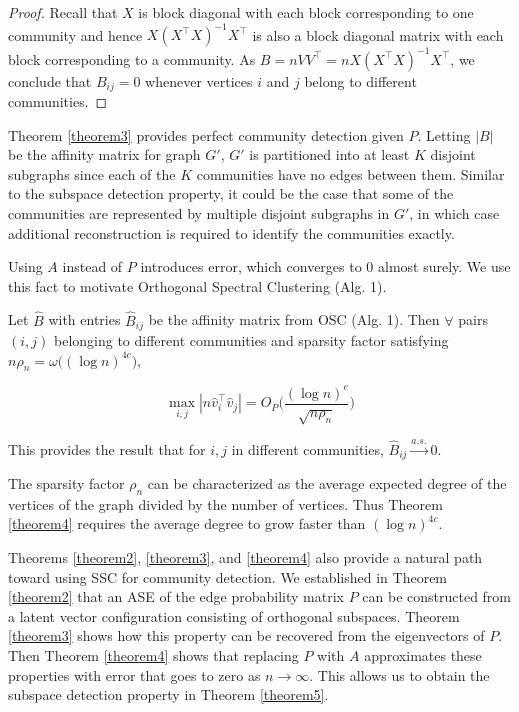 \documentclass[12pt]{article}
\begin{document}
\begin{proof}
Recall that \(X\) is block diagonal with each block
corresponding to one community and hence \(X (X^\top X)^{-1} X^\top\) is also a
block diagonal matrix with each block corresponding to a community. As $B = n VV^{\top} = n X (X^\top X)^{-1} X^\top$, we
conclude that $B_{ij} = 0$ whenever vertices $i$ and $j$ belong to different communities.  
\end{proof}


Theorem \ref{theorem3} provides perfect community detection given \(P\).
Letting \(|B|\) be the affinity matrix for graph \(G'\), \(G'\) is
partitioned into at least \(K\) disjoint subgraphs since each of the
\(K\) communities have no edges between them. Similar to the subspace
detection property, it could be the case that some of the communities
are represented by multiple disjoint subgraphs in \(G'\), in which case
additional reconstruction is required to identify the communities
exactly.

Using \(A\) instead of \(P\) introduces error, which converges to \(0\)
almost surely. We use this fact to motivate Orthogonal Spectral Clustering 
(Alg. 1).

\begin{theorem}
\label{theorem4}
Let $\hat{B}$ with entries $\hat{B}_{ij}$ be the affinity matrix from OSC
(Alg. 1). Then $\forall$ pairs $(i, j)$ belonging to different communities
and sparsity factor satisfying $n \rho_n = \omega \big( (\log n)^{4c} \big)$,

\begin{equation} \label{eq:thm4}
\max_{i, j} |n \hat{v}_i^\top \hat{v}_j| =
O_P \Big( \frac{(\log n)^c}{\sqrt{n \rho_n}} \Big)
\end{equation}

This provides the result that for $i, j$ in different communities,
$\hat{B}_{ij} \stackrel{a.s.}{\to} 0$.
\end{theorem}

The sparsity factor $\rho_n$ can be characterized as 
the average expected degree of the vertices of the graph 
divided by the number of vertices. 
Thus Theorem \ref{theorem4} requires the average degree 
to grow faster than $(\log n)^{4c}$.

Theorems \ref{theorem2}, \ref{theorem3}, and \ref{theorem4} also provide
a natural path toward using SSC for community detection. 
We established in Theorem \ref{theorem2} that an ASE of the edge
probability matrix \(P\) can be constructed from a latent vector configuration 
consisting of orthogonal subspaces. Theorem \ref{theorem3} shows how 
this property can be recovered from the eigenvectors of \(P\). 
Then Theorem \ref{theorem4} shows that replacing $P$ with $A$ 
approximates these properties with error that goes to zero as \(n \to \infty\). 
This allows us to obtain the subspace detection property 
in Theorem \ref{theorem5}. 
\end{document}
